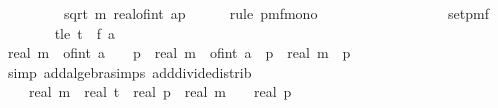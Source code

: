 \begin{isabellebody}
\ \ \ \ \ \ {\isasymge}\ {}\ {\isacharasterisk}{\kern0pt}\ sqrt\ {\isacharparenleft}{\kern0pt}m\ {\isacharasterisk}{\kern0pt}{\isacharparenleft}{\kern0pt}real{\isacharunderscore}{\kern0pt}of{\isacharunderscore}{\kern0pt}int\ a{\isacharplus}{\kern0pt}{}{\isacharparenright}{\kern0pt}{\isacharslash}{\kern0pt}p{\isacharparenright}{\kern0pt}{\isacharparenright}{\kern0pt}{\isachardoublequoteclose}\isanewline
\ \ \ \ \isamarkupfalse%
\ {\isacharparenleft}{\kern0pt}rule\ pmf{\isacharunderscore}{\kern0pt}mono{\isacharunderscore}{\kern0pt}{}{\isacharparenright}{\kern0pt}\isanewline
\ \ \ \ \ \ \isamarkupfalse%
\ {\isasymomega}\isanewline
\ \ \ \ \ \ \isamarkupfalse%
\ {\isachardoublequoteopen}{\isasymomega}\ {\isasymin}\ set{\isacharunderscore}{\kern0pt}pmf\ {\isasymOmega}\isanewline
\ \ \ \ \ \ \isamarkupfalse%
\ t{\isacharunderscore}{\kern0pt}le{\isacharcolon}{\kern0pt}\ {\isachardoublequoteopen}t\ {\isasymle}\ f\ a\ {\isasymomega}{\isachardoublequoteclose}\isanewline
\ \ \ \ \ \ \isamarkupfalse%
\ {\isachardoublequoteopen}real\ m\ {\isacharasterisk}{\kern0pt}\ {\isacharparenleft}{\kern0pt}of{\isacharunderscore}{\kern0pt}int\ a\ {\isacharplus}{\kern0pt}\ {}{\isacharparenright}{\kern0pt}\ {\isacharslash}{\kern0pt}\ p\ {\isacharequal}{\kern0pt}\ real\ m\ {\isacharasterisk}{\kern0pt}\ {\isacharparenleft}{\kern0pt}of{\isacharunderscore}{\kern0pt}int\ a{\isacharparenright}{\kern0pt}\ {\isacharslash}{\kern0pt}\ p\ {\isacharplus}{\kern0pt}\ real\ m\ {\isacharslash}{\kern0pt}\ p{\isachardoublequoteclose}\isanewline
\ \ \ \ \ \ \ \ \isamarkupfalse%
\ {\isacharparenleft}{\kern0pt}simp\ add{\isacharcolon}{\kern0pt}algebra{\isacharunderscore}{\kern0pt}simps\ add{\isacharunderscore}{\kern0pt}divide{\isacharunderscore}{\kern0pt}distrib{\isacharparenright}{\kern0pt}\isanewline
\ \ \ \ \ \ \isamarkupfalse%
\ \isamarkupfalse%
\ {\isachardoublequoteopen}{\isachardot}{\kern0pt}{\isachardot}{\kern0pt}{\isachardot}{\kern0pt}\ {\isasymle}\ \ real\ m\ {\isacharasterisk}{\kern0pt}\ {\isacharparenleft}{\kern0pt}real\ t\ {\isacharasterisk}{\kern0pt}\ real\ p\ {\isacharslash}{\kern0pt}\ {\isacharparenleft}{\kern0pt}real\ m\ {\isacharasterisk}{\kern0pt}\ {\isacharparenleft}{\kern0pt}{}{\isacharplus}{\kern0pt}{\isasymdelta}{\isacharprime}{\kern0pt}{\isacharparenright}{\kern0pt}{\isacharparenright}{\kern0pt}{\isacharparenright}{\kern0pt}\ {\isacharslash}{\kern0pt}\ real\ p\ {\isacharplus}{\kern0pt}\ {}{\isachardoublequoteclose}\isanewline

\end{isabellebody}
